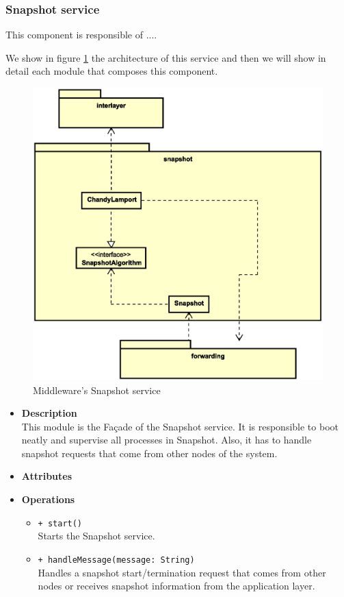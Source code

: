 \subsubsection{Snapshot service}
This component is responsible of ....

We show in figure \ref{fig:mw-snapshot} the architecture of this service and
then we will show in detail each module that composes this component.

\begin{figure}[H]
  \centering
  \includegraphics[width=\columnwidth]{images/solution/mw/snapshot.eps}
  \caption{Middleware's Snapshot service}
  \label{fig:mw-snapshot}
\end{figure}

\FloatBarrier
\begin{itemize}
  \item \textbf{Description} \\
    This module is the Fa\c cade of the Snapshot service. It is responsible
    to boot neatly and supervise all processes in Snapshot. Also, it has to
    handle snapshot requests that come from other nodes of the system.
  \item \textbf{Attributes}
  \item \textbf{Operations}
  \begin{itemize}
    \item \texttt{+ start()} \\
    Starts the Snapshot service.
    \item \texttt{+ handleMessage(message: String)} \\
    Handles a snapshot start/termination request that comes from other nodes
    or receives snapshot information from the application layer.
  \end{itemize}
\end{itemize}

